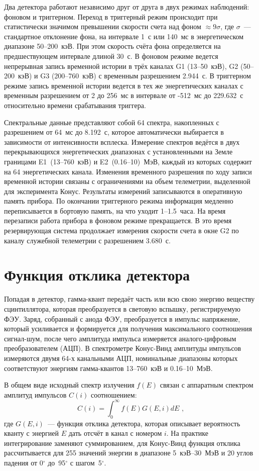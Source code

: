Два детектора работают независимо друг от друга в двух режимах наблюдений: 
фоновом и триггерном. Переход в триггерный режим происходит при статистически 
значимом превышении скорости счета над фоном $\approx 9\sigma$, 
где $\sigma$~--- стандартное отклонение фона, на интервале 1~с или 140~мс 
в энергетическом диапазоне 50--200~кэВ. При этом скорость счёта фона 
определяется на предшествующем интервале длиной 30~с. В фоновом режиме ведется 
непрерывная запись временной истории в трёх каналах G1 (13--50~кэВ), G2 (50--200~кэВ) 
и G3 (200--760~кэВ) с временным разрешением 2.944~с. В триггерном режиме запись 
временной истории ведется в тех же энергетических каналах с временным разрешением 
от 2 до 256~мс в интервале от -512~мс до 229.632~с относительно времени срабатывания 
триггера.

Спектральные данные представляют собой 64 спектра, накопленных с разрешением от 64~мс до 8.192~с, 
которое автоматически выбирается в зависимости от интенсивности всплеска. Измерение спектров ведётся 
в двух перекрывающихся энергетических диапазонах с установленными на Земле границами 
E1~(13--760~кэВ) и E2~(0.16--10)~МэВ, каждый из которых содержит на 64 энергетических канала. 
Изменения временного разрешения по ходу записи временной истории связаны с ограничениями на объем телеметрии, 
выделенной для эксперимента Конус. Результаты измерений записываются в оперативную 
память прибора. По окончании триггерного режима информация медленно переписывается 
в бортовую память, на что уходит 1--1.5~часа. На время перезаписи работа прибора 
в фоновом режиме прекращается. В это время резервирующая система продолжает измерения
скорости счета в окне G2 по каналу служебной телеметрии с разрешением 3.680~с.

\section{Функция отклика детектора}
Попадая в детектор, гамма-квант передаёт часть или всю свою энергию веществу 
сцинтиллятора, которая преобразуется в световую вспышку, регистрируемую ФЭУ. 
Заряд, собранный с анода ФЭУ, преобразуется в импульс напряжение, который усиливается и формируется для получения 
максимального соотношения сигнал-шум, после чего амплитуда импульса измеряется 
аналого-цифровым преобразователем (АЦП). В спектрометре Конус-Винд амплитуды импульсов 
измеряются двумя 64-х канальными АЦП, номинальные диапазоны которых 
соответствуют энергиям гамма-квантов 13--760~кэВ и 0.16--10~МэВ.

В общем виде исходный спектр излучения $f(E)$ связан с аппаратным спектром амплитуд 
импульсов $C(i)$ соотношением:
\begin{equation}\label{eq:response}
    C(i)=\int_{0}^{\infty} f(E)G(E,i) dE \mbox{ ,}
\end{equation}
где $G(E,i)$~--- функция отклика детектора, которая описывает вероятность кванту 
с энергией $E$ дать отсчёт в канал с номером $i$. На практике интегрирование 
заменяют суммированием, для Конус-Винд функция отклика рассчитывается для 255 
значений энергии в диапазоне 5~кэВ--30~МэВ и 20 углов падения 
от 0$^\circ$ до~95$^\circ$ с шагом~5$^\circ$.

